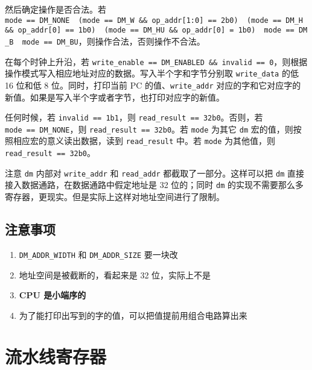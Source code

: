 \documentclass[12pt,AutoFakeBold,AutoFakeSlant]{article}
\providecommand{\tightlist}{%
  \setlength{\itemsep}{0pt}\setlength{\parskip}{0pt}}
\begin{document}
然后确定操作是否合法。若
\texttt{mode\ ==\ DM\_NONE\ \textbar{}\textbar{}\ (mode\ ==\ DM\_W\ \&\&\ op\_addr{[}1:0{]}\ ==\ 2\textquotesingle{}b0)\ \textbar{}\textbar{}\ (mode\ ==\ DM\_H\ \&\&\ op\_addr{[}0{]}\ ==\ 1\textquotesingle{}b0)\ \textbar{}\textbar{}\ (mode\ ==\ DM\_HU\ \&\&\ op\_addr{[}0{]}\ =\ 1\textquotesingle{}b0)\ \textbar{}\textbar{}\ mode\ ==\ DM\_B\ \textbar{}\textbar{}\ mode\ ==\ DM\_BU}，则操作合法，否则操作不合法。

在每个时钟上升沿，若
\texttt{write\_enable\ ==\ DM\_ENABLED\ \&\&\ invalid\ ==\ 0}，则根据操作模式写入相应地址对应的数据。写入半个字和字节分别取
\texttt{write\_data} 的低 16 位和低 8 位。同时，打印当前 PC
的值、\texttt{write\_addr}
对应的字和它对应字的新值。如果是写入半个字或者字节，也打印对应字的新值。

任何时候，若 \texttt{invalid\ ==\ 1\textquotesingle{}b1}，则
\texttt{read\_result\ ==\ 32\textquotesingle{}b0}。否则，若
\texttt{mode\ ==\ DM\_NONE}，则
\texttt{read\_result\ ==\ 32\textquotesingle{}b0}。若 \texttt{mode}
为其它 \texttt{dm} 宏的值，则按照相应宏的意义读出数据，读到
\texttt{read\_result} 中。若 \texttt{mode} 为其他值，则
\texttt{read\_result\ ==\ 32\textquotesingle{}b0}。

注意 \texttt{dm} 内部对 \texttt{write\_addr} 和 \texttt{read\_addr}
都截取了一部分。这样可以把 \texttt{dm}
直接接入数据通路，在数据通路中假定地址是 32 位的；同时 \texttt{dm}
的实现不需要那么多寄存器，更现实。但是实际上这样对地址空间进行了限制。

\hypertarget{ux6ce8ux610fux4e8bux9879-5}{%
\subsection{注意事项}\label{ux6ce8ux610fux4e8bux9879-5}}

\begin{enumerate}
\def\labelenumi{\arabic{enumi}.}
\tightlist
\item
  \texttt{DM\_ADDR\_WIDTH} 和 \texttt{DM\_ADDR\_SIZE} 要一块改
\item
  地址空间是被截断的，看起来是 32 位，实际上不是
\item
  \textbf{CPU 是小端序的}
\item
  为了能打印出写到的字的值，可以把值提前用组合电路算出来
\end{enumerate}

\hypertarget{ux6d41ux6c34ux7ebfux5bc4ux5b58ux5668}{%
\section{流水线寄存器}\label{ux6d41ux6c34ux7ebfux5bc4ux5b58ux5668}}
\end{document}
